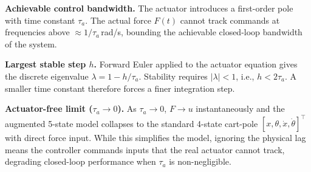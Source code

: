 \textbf{Achievable control bandwidth.} The actuator introduces a first-order pole with time constant $\tau_a$. The actual force $F(t)$ cannot track commands at frequencies above $\approx 1/\tau_a$\,rad/s, bounding the achievable closed-loop bandwidth of the system.

\textbf{Largest stable step $h$.} Forward Euler applied to the actuator equation gives the discrete eigenvalue $\lambda = 1 - h/\tau_a$. Stability requires $|\lambda| < 1$, i.e., $h < 2\tau_a$. A smaller time constant therefore forces a finer integration step.

\textbf{Actuator-free limit ($\tau_a \to 0$).} As $\tau_a \to 0$, $F \to u$ instantaneously and the augmented 5-state model collapses to the standard 4-state cart-pole $[x,\theta,\dot{x},\dot{\theta}]^\top$ with direct force input. While this simplifies the model, ignoring the physical lag means the controller commands inputs that the real actuator cannot track, degrading closed-loop performance when $\tau_a$ is non-negligible.

